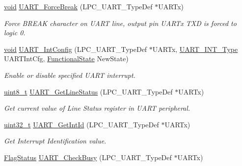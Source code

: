\begin{DoxyCompactItemize}
\hyperlink{usb__devapi_8h_afabf60e7f57651d6d595a02c75f07cd0}{void} \hyperlink{group___u_a_r_t___public___functions_ga68161f5403a077379de35494b6b03273}{U\+A\+R\+T\+\_\+\+Force\+Break} (L\+P\+C\+\_\+\+U\+A\+R\+T\+\_\+\+Type\+Def $\ast$U\+A\+R\+Tx)
\begin{DoxyCompactList}\small\item\em Force B\+R\+E\+AK character on U\+A\+RT line, output pin U\+A\+R\+Tx T\+XD is forced to logic 0. \end{DoxyCompactList}\item 
\hyperlink{usb__devapi_8h_afabf60e7f57651d6d595a02c75f07cd0}{void} \hyperlink{group___u_a_r_t___public___functions_ga4bad6b6b83a5345ea0d78427a5df5284}{U\+A\+R\+T\+\_\+\+Int\+Config} (L\+P\+C\+\_\+\+U\+A\+R\+T\+\_\+\+Type\+Def $\ast$U\+A\+R\+Tx, \hyperlink{group___u_a_r_t___public___types_ga7ee4c5ddc0e165158d0d9f1f03e1b66c}{U\+A\+R\+T\+\_\+\+I\+N\+T\+\_\+\+Type} U\+A\+R\+T\+Int\+Cfg, \hyperlink{agilefox_2library_2inc_2stm32f10x__type_8h_ac9a7e9a35d2513ec15c3b537aaa4fba1}{Functional\+State} New\+State)
\begin{DoxyCompactList}\small\item\em Enable or disable specified U\+A\+RT interrupt. \end{DoxyCompactList}\item 
\hyperlink{_p_e___types_8h_aba7bc1797add20fe3efdf37ced1182c5}{uint8\+\_\+t} \hyperlink{group___u_a_r_t___public___functions_ga089fc39675174ed51294ea96e4417f0d}{U\+A\+R\+T\+\_\+\+Get\+Line\+Status} (L\+P\+C\+\_\+\+U\+A\+R\+T\+\_\+\+Type\+Def $\ast$U\+A\+R\+Tx)
\begin{DoxyCompactList}\small\item\em Get current value of Line Status register in U\+A\+RT peripheral. \end{DoxyCompactList}\item 
\hyperlink{_p_e___types_8h_a33594304e786b158f3fb30289278f5af}{uint32\+\_\+t} \hyperlink{group___u_a_r_t___public___functions_ga09314371b86b1597b7aafd912cf6222f}{U\+A\+R\+T\+\_\+\+Get\+Int\+Id} (L\+P\+C\+\_\+\+U\+A\+R\+T\+\_\+\+Type\+Def $\ast$U\+A\+R\+Tx)
\begin{DoxyCompactList}\small\item\em Get Interrupt Identification value. \end{DoxyCompactList}\item 
\hyperlink{agilefox_2library_2inc_2stm32f10x__type_8h_a89136caac2e14c55151f527ac02daaff}{Flag\+Status} \hyperlink{group___u_a_r_t___public___functions_ga78570fc7b78e558ab87abacd9bb22f73}{U\+A\+R\+T\+\_\+\+Check\+Busy} (L\+P\+C\+\_\+\+U\+A\+R\+T\+\_\+\+Type\+Def $\ast$U\+A\+R\+Tx)

\end{DoxyCompactItemize}
